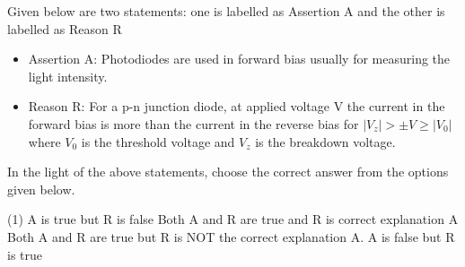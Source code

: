 \item Given below are two statements: one is labelled as Assertion A and the other is labelled as Reason R
\begin{itemize}
    \item Assertion A: Photodiodes are used in forward bias usually for measuring the light intensity.
    \item Reason R: For a p-n junction diode, at applied voltage V the current in the forward bias is more than the current in the reverse bias for \(|V_z| > \pm V \geq |V_0|\) where \(V_0\) is the threshold voltage and \(V_z\) is the breakdown voltage.
\end{itemize}
In the light of the above statements, choose the correct answer from the options given below.
\begin{tasks}(1)
    \task A is true but R is false
    \task Both A and R are true and R is correct explanation A
    \task Both A and R are true but R is NOT the correct explanation A.   
    \task A is false but R is true
\end{tasks}